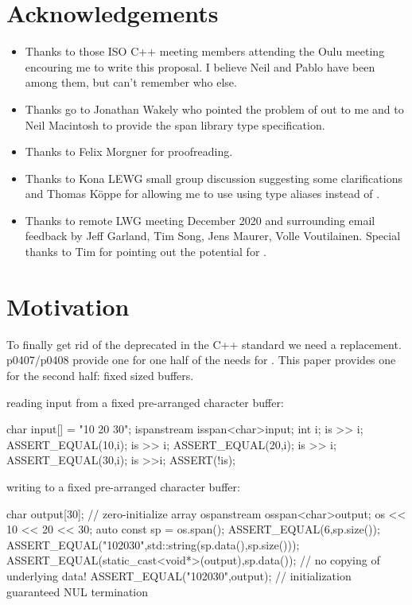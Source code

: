 \documentclass[ebook,11pt,article]{memoir}
\begin{document}
\chapter{Acknowledgements}
\begin{itemize}
\item Thanks to those ISO C++ meeting members attending the Oulu meeting encouring me to write this proposal. I believe Neil and Pablo have been among them, but can't remember who else.
\item Thanks go to Jonathan Wakely who pointed the problem of  out to me and to Neil Macintosh to provide the span library type specification.
\item Thanks to Felix Morgner for proofreading.
\item Thanks to Kona LEWG small group discussion suggesting some clarifications and Thomas K\"oppe for allowing me to use using type aliases instead of .
\item Thanks to remote LWG meeting December 2020 and surrounding email feedback by Jeff Garland, Tim Song, Jens Maurer, Volle Voutilainen. Special thanks to Tim for pointing out the  potential for .
\end{itemize}

\chapter{Motivation}
To finally get rid of the deprecated  in the C++ standard we need a replacement. p0407/p0408 provide one for one half of the needs for . This paper provides one for the second half: fixed sized buffers. 

\begin{example} reading input from a fixed pre-arranged character buffer:
\begin{codeblock}
char input[] = "10 20 30";
ispanstream is{span<char>{input}};
int i;
is >> i;
ASSERT_EQUAL(10,i);
is >> i;
ASSERT_EQUAL(20,i);
is >> i;
ASSERT_EQUAL(30,i);
is >>i;
ASSERT(!is);
\end{codeblock}
\end{example}
\begin{example} writing to a fixed pre-arranged character buffer:
\begin{codeblock}
char  output[30]{}; // zero-initialize array
ospanstream os{span<char>{output}};
os << 10 << 20 << 30;
auto const sp = os.span();
ASSERT_EQUAL(6,sp.size());
ASSERT_EQUAL("102030",std::string(sp.data(),sp.size()));
ASSERT_EQUAL(static_cast<void*>(output),sp.data()); // no copying of underlying data!
ASSERT_EQUAL("102030",output); // initialization guaranteed NUL termination
\end{codeblock}
\end{example}
\end{document}
